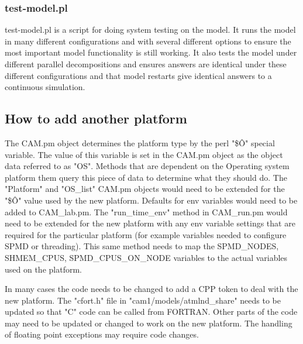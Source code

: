 \documentclass[]{article}
\begin{document}
\subsubsection{test-model.pl}
test-model.pl is a script for doing system testing on the model. It runs the model in many different
configurations and with several different options to ensure the most important model functionality
is still working. It also tests the model under different parallel decompositions and ensures
answers are identical under these different configurations and that model restarts give identical
answers to a continuous simulation.

\subsection{How to add another platform}

The CAM.pm object determines the platform type by the perl "\$\^O" special variable. The
value of this variable is set in the CAM.pm object as the object data referred to as "OS".
Methods that are dependent on the Operating system platform them query this piece of data
to determine what they should do. The "Platform" and "OS\_list" CAM.pm objects would need to
be extended for the "\$\^O" value used by the new platform. Defaults for env variables
would need to be added to CAM\_lab.pm. The "run\_time\_env" method in CAM\_run.pm would need
to be extended for the new platform with any env variable settings that are required for the
particular platform (for example variables needed to configure SPMD or threading). This same
method needs to map the SPMD\_NODES, SHMEM\_CPUS, SPMD\_CPUS\_ON\_NODE variables to the actual
variables used on the platform. 

In many cases the code needs to be changed to add a CPP token to deal with the new platform.
The "cfort.h" file in "cam1/models/atmlnd\_share" needs to be updated so that "C" code can
be called from FORTRAN. Other parts of the code may need to be updated or changed to work
on the new platform. The handling of floating point exceptions may require code changes.
\end{document}

